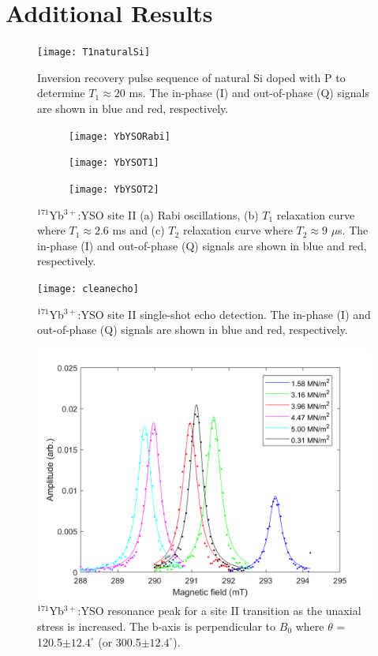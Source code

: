 \chapter{\label{sec:additionalresults}Additional Results}

\begin{figure}[h]
\centering
\texttt{[image: T1naturalSi]}
\caption{\label{fig:T1naturalSi} Inversion recovery pulse sequence of natural Si doped with P to determine $T_{1} \approx 20$ ms. The in-phase (I) and out-of-phase (Q) signals are shown in blue and red, respectively.}
\end{figure}

\begin{figure}[H]
    \centering
    \begin{subfigure}[b]{0.45\textwidth}
        \centering
        \texttt{[image: YbYSORabi]}
        \caption{\label{fig:YbYSORabi}}
    \end{subfigure}
    \begin{subfigure}[b]{0.45\textwidth}
        \centering
        \texttt{[image: YbYSOT1]}
   \caption{\label{fig:YbYSOT1}}
   \end{subfigure}
   \begin{subfigure}[b]{0.45\textwidth}
        \centering
        \texttt{[image: YbYSOT2]}
        \caption{\label{fig:YbYSOT2}}
    \end{subfigure}
    \caption{$^{171}$Yb$^{3+}$:YSO site II (a) Rabi oscillations, (b) $T_{1}$ relaxation curve where $T_{1}\approx 2.6$ ms and (c) $T_{2}$ relaxation curve where $T_{2} \approx 9$ $\mu$s. The in-phase (I) and out-of-phase (Q) signals are shown in blue and red, respectively.}
\end{figure}


\begin{figure}[h]
\centering
\texttt{[image: cleanecho]}
\caption{\label{fig:cleanecho} $^{171}$Yb$^{3+}$:YSO site II single-shot echo detection. The in-phase (I) and out-of-phase (Q) signals are shown in blue and red, respectively.}
\end{figure}


\begin{figure}[h]
\centering
\includegraphics[height=0.5\textwidth,keepaspectratio]{0gfittingpeaks}
\caption{\label{fig:0gfittingpeaks} $^{171}$Yb$^{3+}$:YSO resonance peak for a site II transition as the unaxial stress is increased. The b-axis is perpendicular to $B_{0}$ where $\theta$ = 120.5$\pm 12.4 ^{\circ}$ (or 300.5$\pm 12.4^{\circ}$).}
\end{figure}


